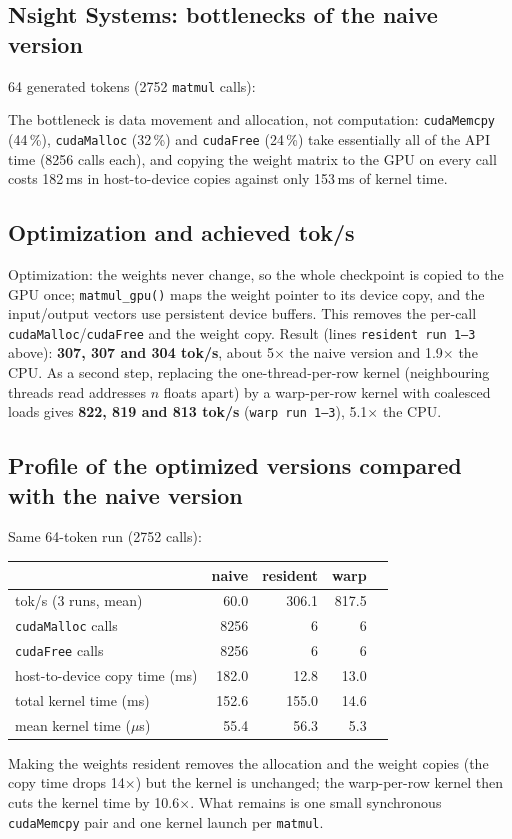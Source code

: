 \documentclass[11pt,a4paper]{article}
\begin{document}
\subsection{Nsight Systems: bottlenecks of the naive version}
64 generated tokens (2752 \texttt{matmul} calls):

The bottleneck is data movement and allocation, not computation: \texttt{cudaMemcpy} (44\,\%), \texttt{cudaMalloc}
(32\,\%) and \texttt{cudaFree} (24\,\%) take essentially all of the API time (8256 calls each), and copying the
weight matrix to the GPU on every call costs 182\,ms in host-to-device copies against only 153\,ms of kernel time.

\subsection{Optimization and achieved tok/s}
Optimization: the weights never change, so the whole checkpoint is copied to the GPU once; \texttt{matmul\_gpu()}
maps the weight pointer to its device copy, and the input/output vectors use persistent device buffers. This
removes the per-call \texttt{cudaMalloc}/\texttt{cudaFree} and the weight copy. Result (lines \texttt{resident run 1--3}
above): \textbf{307, 307 and 304 tok/s}, about 5$\times$ the naive version and 1.9$\times$ the CPU. As a second step, replacing the
one-thread-per-row kernel (neighbouring threads read addresses $n$ floats apart) by a warp-per-row kernel with
coalesced loads gives \textbf{822, 819 and 813 tok/s} (\texttt{warp run 1--3}), 5.1$\times$ the CPU.

\subsection{Profile of the optimized versions compared with the naive version}
Same 64-token run (2752 calls):
\begin{center}
\small
\begin{tabular}{lrrrr}
\toprule
 & naive & resident & warp \\
\midrule
tok/s (3 runs, mean)          & 60.0 & 306.1 & 817.5 \\
\texttt{cudaMalloc} calls     & 8256 & 6 & 6 \\
\texttt{cudaFree} calls       & 8256 & 6 & 6 \\
host-to-device copy time (ms) & 182.0 & 12.8 & 13.0 \\
total kernel time (ms)        & 152.6 & 155.0 & 14.6 \\
mean kernel time ($\mu$s)     & 55.4 & 56.3 & 5.3 \\
\bottomrule
\end{tabular}
\end{center}


Making the weights resident removes the allocation and the weight copies (the copy time drops 14$\times$) but the
kernel is unchanged; the warp-per-row kernel then cuts the kernel time by 10.6$\times$. What remains is one small
synchronous \texttt{cudaMemcpy} pair and one kernel launch per \texttt{matmul}.
\end{document}
